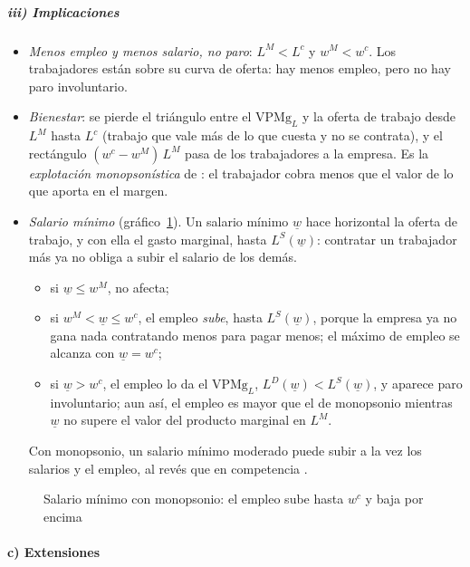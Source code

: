 \documentclass[11pt]{article}
\begin{document}
\subparagraph{iii) Implicaciones}

\begin{itemize}
\item \emph{Menos empleo y menos salario, no paro}: $L^M<L^c$ y $w^M<w^c$. Los trabajadores están sobre su curva de oferta: hay menos empleo, pero no hay paro involuntario.
\item \emph{Bienestar}: se pierde el triángulo entre el $\mathrm{VPMg}_L$ y la oferta de trabajo desde $L^M$ hasta $L^c$ (trabajo que vale más de lo que cuesta y no se contrata), y el rectángulo $(w^c-w^M)\,L^M$ pasa de los trabajadores a la empresa. Es la \emph{explotación monopsonística} de \textcite{Robinson1933Economics}: el trabajador cobra menos que el valor de lo que aporta en el margen.
\item \emph{Salario mínimo} (gráfico~\ref{fig:salario-minimo}). Un salario mínimo $\underline{w}$ hace horizontal la oferta de trabajo, y con ella el gasto marginal, hasta $L^S(\underline{w})$: contratar un trabajador más ya no obliga a subir el salario de los demás.
  \begin{itemize}
  \item si $\underline{w}\leq w^M$, no afecta;
  \item si $w^M<\underline{w}\leq w^c$, el empleo \emph{sube}, hasta $L^S(\underline{w})$, porque la empresa ya no gana nada contratando menos para pagar menos; el máximo de empleo se alcanza con $\underline{w}=w^c$;
  \item si $\underline{w}>w^c$, el empleo lo da el $\mathrm{VPMg}_L$, $L^D(\underline{w})<L^S(\underline{w})$, y aparece paro involuntario; aun así, el empleo es mayor que el de monopsonio mientras $\underline{w}$ no supere el valor del producto marginal en $L^M$.
  \end{itemize}
  Con monopsonio, un salario mínimo moderado puede subir a la vez los salarios y el empleo, al revés que en competencia .
\end{itemize}

\begin{figure}[H]
\centering
\caption{Salario mínimo con monopsonio: el empleo sube hasta $w^c$ y baja por encima}\label{fig:salario-minimo}
\end{figure}

\paragraph{c) Extensiones}
\end{document}
